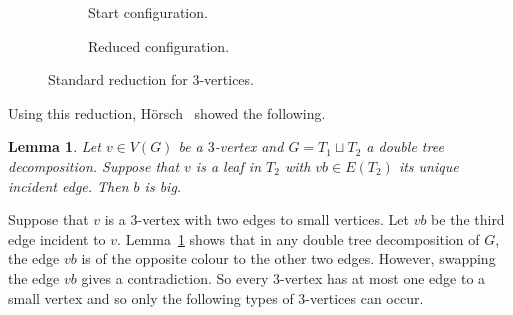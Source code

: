 \documentclass[11pt, reqno, a4paper]{article}
\newtheorem{lemma}{Lemma}[section]
\theoremstyle{definition}
\numberwithin{equation}{section}
\begin{document}
\begin{figure}[ht]
	\centering
	\begin{subfigure}{0.4\textwidth}
    \centering
	\caption{Start configuration.} 
	\label{fig:3red}
	\end{subfigure}
	\begin{subfigure}{0.4\textwidth}
    \centering
	\caption{Reduced configuration.}
	\label{fig:3redb}
	\end{subfigure}
	\caption{Standard reduction for $3$-vertices.}
\end{figure}
Using this reduction, H\"orsch~\cite[Proposition 10]{horsch2021globally} showed the following.
\begin{lemma}\label{lem:3vertsbig}
    Let \(v \in V(G)\) be a \(3\)-vertex and \(G = T_1 \sqcup T_2 \) a double tree decomposition. Suppose that \(v\) is a leaf in \(T_2\) with \(vb \in E(T_2)\) its unique incident edge. Then \(b\) is big.
\end{lemma}
Suppose that \(v\) is a \(3\)-vertex with two edges to small vertices. Let \(vb\) be the third edge incident to \(v\). Lemma~\ref{lem:3vertsbig} shows that in any double tree decomposition of \(G\), the edge \(vb\) is of the opposite colour to the other two edges. However, swapping the edge \(vb\) gives a contradiction. So every \(3\)-vertex has at most one edge to a small vertex and so only the following types of 3-vertices can occur.
\end{document}
